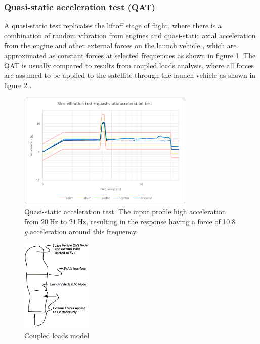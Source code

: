 \documentclass[a4paper,11pt]{article}
\begin{document}
\subsubsection{Quasi-static acceleration test (QAT)}
A quasi-static test replicates the liftoff stage of flight, where there is a combination of random vibration from engines and quasi-static axial acceleration from the engine and other external forces on the launch vehicle \cite{nieto2019cubesat,brown_elements_2002}, which are approximated as constant forces at selected frequencies as shown in figure \ref{fig:qatforces}. The QAT is usually compared to results from coupled loads analysis, where all forces are assumed to be applied to the satellite through the launch vehicle as shown in figure \ref{fig:cla} \cite{dickens2001coupled}.

\begin{figure}[H]
  \centering
  \includegraphics[width=0.75\textwidth]{images/qat.png}
  \caption{Quasi-static acceleration test. The input profile high acceleration from $\SI{20}{\hertz}$ to $\SI{21}{\hertz}$, resulting in the response having a force of 10.8 \textit{g} acceleration around this frequency \cite{nieto2019cubesat}}
  \label{fig:qatforces}
\end{figure}

\begin{figure}[H]
  \centering
  \includegraphics[width=0.3\textwidth]{images/cla.png}
  \caption{Coupled loads model \cite{dickens2001coupled}}
  \label{fig:cla}
\end{figure}
\end{document}
